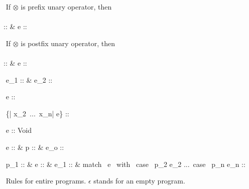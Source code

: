 \documentclass[12pt]{article}
\begin{document}
$ $\newline
If $\otimes$ is prefix unary operator, then\\\\
      {\Gamma \vdash \otimes :: \alpha \shortrightarrow \tau 
      & \Gamma \vdash e :: \alpha}

$ $\newline
If $\otimes$ is postfix unary operator, then\\\\
    {\Gamma \vdash \otimes :: \alpha \shortrightarrow \tau 
    & \Gamma \vdash e :: \alpha}

$ $\newline
{}
      {\Gamma \vdash e_1 :: \alpha
      &  \vdash e_2 :: \tau}

$ $\newline
{}
      {\vdash e :: \beta }

$ $\newline
{}
      { \vdash \{| x_2\, ...\, x_n|\,\,e\} :: \beta}

$ $\newline 
{}
      {\Gamma \vdash e :: Void}

$ $\newline 
{}
      {\Gamma \vdash e :: \alpha
      & \Gamma \vdash p :: \alpha
      & \Gamma \vdash e_o :: \tau}

$ $\newline
{}
      {\Gamma \vdash p_1 :: \alpha
      & \Gamma \vdash e :: \alpha
      & \Gamma \vdash e_1 :: \tau
      & match \, e \, with \, case \, p_2 \Rightarrow e_2\,\,...\,
                              case \, p_n \Rightarrow e_n :: \tau}

$ $\newline
Rules for entire programs. $\epsilon$ stands for an empty program.\\
\end{document}
